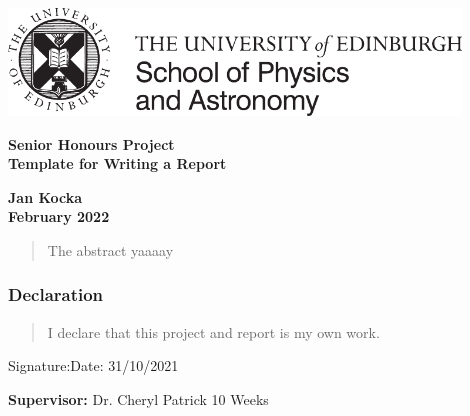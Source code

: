 \documentclass[a4paper,12pt]{article}
\begin{document}
\pagestyle{empty}
\par\noindent\includegraphics[width=12cm]{PandA_crest.pdf}
\par\noindent

\vspace*{2cm}

\begin{center}
        \Large\bf \Large\bf Senior Honours Project \\
        \LARGE\bf Template for Writing a Report
\end{center}

\vspace*{0.5cm}

\begin{center}
        \bf Jan Kocka \\
        February 2022
\end{center}
\vspace*{5mm}

\begin{abstract}
    The abstract yaaaay
\end{abstract}

\vspace*{1cm}

\subsubsection*{Declaration}

\begin{quotation}
  I declare that this project and report is my own work.
\end{quotation}

\vspace*{2cm}
Signature:\hspace*{8cm}Date:  31/10/2021

\vfill
{\bf Supervisor:} Dr. Cheryl Patrick
\hfill
10 Weeks
\newpage

\pagestyle{plain}
\setcounter{page}{1}

\tableofcontents

\newpage
\end{document}
